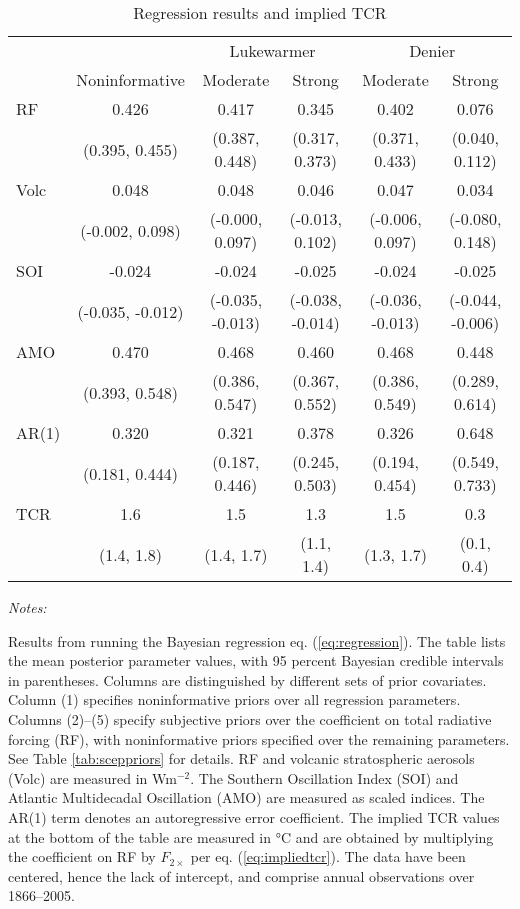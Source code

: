 \documentclass[smallextended]{svjour3}       %
\begin{document}
\begin{table}

\caption{\label{tab:regtab}Regression results and implied TCR \label{tab:reg}}
\centering
\fontsize{8}{10}\selectfont
\begin{threeparttable}
\begin{tabular}[t]{lccccc}
\toprule
\multicolumn{2}{c}{ } & \multicolumn{2}{c}{Lukewarmer} & \multicolumn{2}{c}{Denier} \\
\cmidrule(l{3pt}r{3pt}){3-4} \cmidrule(l{3pt}r{3pt}){5-6}
 & Noninformative & Moderate & Strong & Moderate & Strong\\
\midrule
RF & 0.426 & 0.417 & 0.345 & 0.402 & 0.076\\
 & (0.395, 0.455) & (0.387, 0.448) & (0.317, 0.373) & (0.371, 0.433) & (0.040, 0.112)\\
Volc & 0.048 & 0.048 & 0.046 & 0.047 & 0.034\\
 & (-0.002, 0.098) & (-0.000, 0.097) & (-0.013, 0.102) & (-0.006, 0.097) & (-0.080, 0.148)\\
SOI & -0.024 & -0.024 & -0.025 & -0.024 & -0.025\\
\addlinespace
 & (-0.035, -0.012) & (-0.035, -0.013) & (-0.038, -0.014) & (-0.036, -0.013) & (-0.044, -0.006)\\
AMO & 0.470 & 0.468 & 0.460 & 0.468 & 0.448\\
 & (0.393, 0.548) & (0.386, 0.547) & (0.367, 0.552) & (0.386, 0.549) & (0.289, 0.614)\\
\hline
AR(1) & 0.320 & 0.321 & 0.378 & 0.326 & 0.648\\
 & (0.181, 0.444) & (0.187, 0.446) & (0.245, 0.503) & (0.194, 0.454) & (0.549, 0.733)\\
\hline
\addlinespace
TCR & 1.6 & 1.5 & 1.3 & 1.5 & 0.3\\
 & (1.4, 1.8) & (1.4, 1.7) & (1.1, 1.4) & (1.3, 1.7) & (0.1, 0.4)\\
\bottomrule
\end{tabular}
\begin{tablenotes}[para]
\item \textit{Notes:} 
\item Results from running the Bayesian regression eq. (\ref{eq:regression}). The table lists the mean posterior parameter values, with 95 percent Bayesian credible intervals in parentheses. Columns are distinguished by different sets of prior covariates. Column (1) specifies noninformative priors over all regression parameters. Columns (2)--(5) specify subjective priors over the coefficient on total radiative forcing (RF), with noninformative priors specified over the remaining parameters. See Table \ref{tab:sceppriors} for details. RF and volcanic stratospheric aerosols (Volc) are measured in Wm$^{-2}$. The Southern Oscillation Index (SOI) and Atlantic Multidecadal Oscillation (AMO) are measured as scaled indices. The AR(1) term denotes an autoregressive error coefficient. The implied TCR values at the bottom of the table are measured in °C and are obtained by multiplying the coefficient on RF by $F_{2\times}$ per eq. (\ref{eq:impliedtcr}). The data have been centered, hence the lack of intercept, and comprise annual observations over 1866--2005.

\end{tablenotes}
\end{threeparttable}
\end{table}
\end{document}
